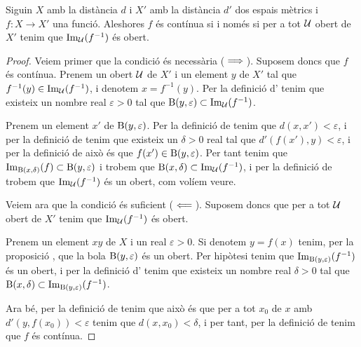 \documentclass[../Apunts.tex]{subfiles}
\begin{document}
	\begin{theorem}
		Siguin \(X\) amb la distància \(d\) i \(X'\) amb la distància \(d'\) dos espais mètrics i \(f\colon X\longrightarrow X'\) una funció. Aleshores \(f\) és contínua si i només si per a tot \(\mathcal{U}\) obert de \(X'\) tenim que \(\operatorname*{Im}_{\mathcal{U}}(f^{-1})\) és obert.
		\begin{proof}
			Veiem primer que la condició és necessària (\(\implies\)). Suposem doncs que \(f\) és contínua. Prenem un obert \(\mathcal{U}\) de \(X'\) i un element \(y\) de \(X'\) tal que \(f^{-1}(y)\in\operatorname*{Im}_{\mathcal{U}}(f^{-1})\), i denotem \(x=f^{-1}(y)\). Per la definició d' tenim que existeix un nombre real \(\varepsilon>0\) tal que \(\operatorname{B}(y,\varepsilon)\subset\operatorname*{Im}_{\mathcal{U}}(f^{-1})\).
			
			Prenem un element \(x'\) de \(\operatorname{B}(y,\varepsilon)\). Per la definició de  tenim que \(d(x,x')<\varepsilon\), i per la definició de  tenim que existeix un \(\delta>0\) real tal que \(d'(f(x'),y)<\varepsilon\), i per la definició de  això és que \(f(x')\in\operatorname{B}(y,\varepsilon)\). Per tant tenim que \(\operatorname*{Im}_{\operatorname{B}(x,\delta)}(f)\subset\operatorname{B}(y,\varepsilon)\) i trobem que \(\operatorname{B}(x,\delta)\subset\operatorname*{Im}_{\mathcal{U}}(f^{-1})\), i per la definició de  trobem que \(\operatorname*{Im}_{\mathcal{U}}(f^{-1})\) és un obert, com volíem veure.
			
			Veiem ara que la condició és suficient (\(\impliedby\)). Suposem doncs que per a tot \(\mathcal{U}\) obert de \(X'\) tenim que \(\operatorname*{Im}_{\mathcal{U}}(f^{-1})\) és obert.
			
			Prenem un element \(xy\) de \(X\) i un real \(\varepsilon>0\). Si denotem \(y=f(x)\) tenim, per la proposició , que la bola \(\operatorname{B}(y,\varepsilon)\) és un obert. Per hipòtesi tenim que \(\operatorname*{Im}_{\operatorname{B}(y,\varepsilon)}(f^{-1})\) és un obert, i per la definició d' tenim que existeix un nombre real \(\delta>0\) tal que \(\operatorname{B}(x,\delta)\subset\operatorname*{Im}_{\operatorname{B}(y,\varepsilon)}(f^{-1})\).
			
			Ara bé, per la definició de  tenim que això és que per a tot \(x_{0}\) de \(x\) amb \(d'(y,f(x_{0}))<\varepsilon\) tenim que \(d(x,x_{0})<\delta\), i per tant, per la definició de  tenim que \(f\) és contínua.
		\end{proof}
	\end{theorem}
\end{document}
